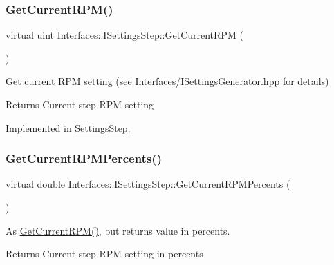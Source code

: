 \subsubsection{\texorpdfstring{Get\+Current\+R\+P\+M()}{GetCurrentRPM()}}
{\footnotesize\ttfamily virtual uint Interfaces\+::\+I\+Settings\+Step\+::\+Get\+Current\+R\+PM (\begin{DoxyParamCaption}{ }\end{DoxyParamCaption})\hspace{0.3cm}{\ttfamily [pure virtual]}}



Get current R\+PM setting (see \hyperlink{_i_settings_generator_8hpp_source}{Interfaces/\+I\+Settings\+Generator.\+hpp} for details) 

\begin{DoxyReturn}{Returns}
Current step R\+PM setting 
\end{DoxyReturn}


Implemented in \hyperlink{class_settings_step_aaba560b593af9bc96eeed3db01a469f4}{Settings\+Step}.

\mbox{\label{class_interfaces_1_1_i_settings_step_abbbb49e91352212c6201a85f1a22253f}} 
\subsubsection{\texorpdfstring{Get\+Current\+R\+P\+M\+Percents()}{GetCurrentRPMPercents()}}
{\footnotesize\ttfamily virtual double Interfaces\+::\+I\+Settings\+Step\+::\+Get\+Current\+R\+P\+M\+Percents (\begin{DoxyParamCaption}{ }\end{DoxyParamCaption})\hspace{0.3cm}{\ttfamily [pure virtual]}}



As \hyperlink{class_interfaces_1_1_i_settings_step_ac2b2370bf70fb09a9e1da4db922e8903}{Get\+Current\+R\+P\+M()}, but returns value in percents. 

\begin{DoxyReturn}{Returns}
Current step R\+PM setting in percents 
\end{DoxyReturn}


